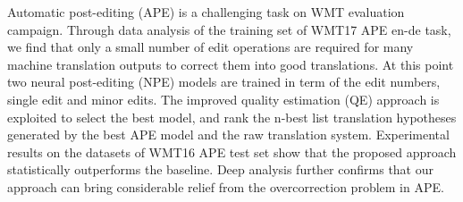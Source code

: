 Automatic post-editing (APE) is a challenging task on WMT evaluation campaign. Through data analysis of the training set of WMT17 APE en-de task, we find that only a small number of edit operations are required for many machine translation outputs to correct them into good translations. At this point two neural post-editing (NPE) models are trained in term of the edit numbers, single edit and minor edits. The improved quality estimation (QE) approach is exploited to select the best model, and rank the n-best list translation hypotheses generated by the best APE model and the raw translation system. Experimental results on the datasets of WMT16 APE test set show that the proposed approach statistically outperforms the baseline. Deep analysis further confirms that our approach can bring considerable relief from the overcorrection problem in APE.
